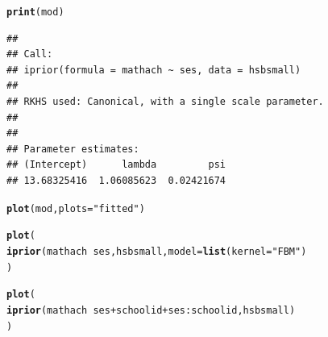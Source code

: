 \documentclass{beamer}\usepackage[]{graphicx}\usepackage[]{color}
\makeatletter
\newcommand{\hlstr}[1]{\textcolor[rgb]{0.192,0.494,0.8}{#1}}%
\newcommand{\hlopt}[1]{\textcolor[rgb]{0,0,0}{#1}}%
\newcommand{\hlstd}[1]{\textcolor[rgb]{0.345,0.345,0.345}{#1}}%
\newcommand{\hlkwc}[1]{\textcolor[rgb]{0.333,0.667,0.333}{#1}}%
\newcommand{\hlkwd}[1]{\textcolor[rgb]{0.737,0.353,0.396}{\textbf{#1}}}%
\newenvironment{kframe}{%
 \def\at@end@of@kframe{}%
 \ifinner\ifhmode%
  \def\at@end@of@kframe{\end{minipage}}%
  \begin{minipage}{\columnwidth}%
 \fi\fi%
 \def\FrameCommand##1{\hskip\@totalleftmargin \hskip-\fboxsep
 \colorbox{shadecolor}{##1}\hskip-\fboxsep
     \hskip-\linewidth \hskip-\@totalleftmargin \hskip\columnwidth}%
 \MakeFramed {\advance\hsize-\width
   \@totalleftmargin\z@ \linewidth\hsize
   \@setminipage}}%
 {\par\unskip\endMakeFramed%
 \at@end@of@kframe}
\newenvironment{knitrout}{}{} %
\makeatother
\begin{document}
\newsavebox{\ipriordemoc}
\begin{lrbox}{\ipriordemoc}
\begin{knitrout}\small
{}\color{fgcolor}\begin{kframe}
\begin{alltt}
\hlkwd{print}\hlstd{(mod)}
\end{alltt}
\begin{verbatim}
## 
## Call:
## iprior(formula = mathach ~ ses, data = hsbsmall)
## 
## RKHS used: Canonical, with a single scale parameter.
## 
## 
## Parameter estimates:
## (Intercept)      lambda         psi 
## 13.68325416  1.06085623  0.02421674
\end{verbatim}
\end{kframe}
\end{knitrout}
\end{lrbox}

\newsavebox{\ipriordemod}
\begin{lrbox}{\ipriordemod}
\begin{knitrout}\small
{}\color{fgcolor}\begin{kframe}
\begin{alltt}
\hlkwd{plot}\hlstd{(mod,} \hlkwc{plots} \hlstd{=} \hlstr{"fitted"}\hlstd{)}
\end{alltt}
\end{kframe}
\end{knitrout}
\end{lrbox}

\newsavebox{\ipriordemoe}
\begin{lrbox}{\ipriordemoe}
\begin{knitrout}\small
{}\color{fgcolor}\begin{kframe}
\begin{alltt}
\hlkwd{plot}(
  \hlkwd{iprior}(mathach ~ ses, hsbsmall, model = \hlkwd{list}(kernel = \hlstr{"FBM"})
)
\end{alltt}
\end{kframe}
\end{knitrout}
\end{lrbox}



\newsavebox{\ipriordemof}
\begin{lrbox}{\ipriordemof}
\begin{knitrout}\small
{}\color{fgcolor}\begin{kframe}
\begin{alltt}
\hlkwd{plot}\hlstd{(}
  \hlkwd{iprior}\hlstd{(mathach} \hlopt{~} \hlstd{ses} \hlopt{+} \hlstd{schoolid} \hlopt{+} \hlstd{ses}\hlopt{:}\hlstd{schoolid, hsbsmall)}
\hlstd{)}
\end{alltt}
\end{kframe}
\end{knitrout}
\end{lrbox}
\end{document}
